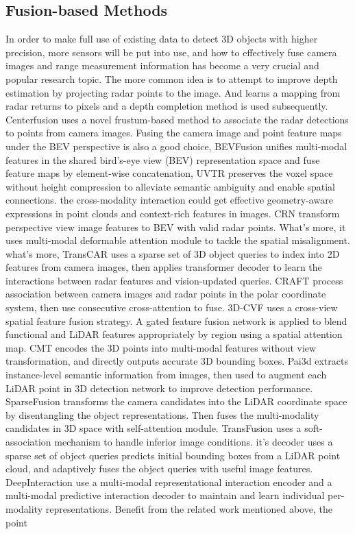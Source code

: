 \documentclass[10pt,twocolumn,letterpaper]{article}
\begin{document}
\subsection{Fusion-based Methods}
In order to make full use of existing data to detect 3D objects with higher precision, more sensors will be put into use, and how to effectively fuse camera images and range measurement information has become a very crucial and popular research topic. The more common idea is to attempt to improve depth estimation by projecting radar points to the image\cite{lin2020depth}. And\cite{long2021radar} learns a mapping from radar returns to pixels and a depth completion method is used subsequently. Centerfusion\cite{nabati2021centerfusion} uses a novel frustum-based method to associate the radar detections to points from camera images. Fusing the camera image and point feature maps under the BEV perspective is also a good choice, BEVFusion\cite{liu2022bevfusion} unifies multi-modal features in the shared bird's-eye view (BEV) representation space and fuse feature maps by element-wise concatenation, UVTR\cite{li2022unifying} preserves the voxel space without height compression to alleviate semantic ambiguity and enable spatial connections. the cross-modality interaction could get effective geometry-aware expressions in point clouds and context-rich features in images. CRN\cite{kim2023crn} transform perspective view image features to BEV with valid radar points. What’s more, it uses multi-modal deformable attention module to tackle the spatial misalignment. what’s more, TransCAR\cite{pang2023transcar} uses a sparse set of 3D object queries to index into 2D features from camera images, then applies transformer decoder to learn the interactions between radar features and vision-updated queries. CRAFT\cite{kim2022craft} process association between camera images and radar points in the polar coordinate system, then use consecutive cross-attention to fuse. 3D-CVF\cite{yoo20203d} uses a cross-view spatial feature fusion strategy. A gated feature fusion network is applied to blend functional and LiDAR features appropriately by region using a spatial attention map. CMT\cite{yan2023cross} encodes the 3D points into multi-modal features without view transformation, and directly outputs accurate 3D bounding boxes. Pai3d\cite{liu2022pai3d} extracts instance-level semantic information from images, then used to augment each LiDAR point in 3D detection network to improve detection performance. SparseFusion\cite{xie2023sparsefusion} transforms the camera candidates into the LiDAR coordinate space by disentangling the object representations. Then fuses the multi-modality candidates in 3D space with self-attention module. TransFusion\cite{bai2022transfusion} uses a soft-association mechanism to handle inferior image conditions. it's decoder uses a sparse set of object queries predicts initial bounding boxes from a LiDAR point cloud, and adaptively fuses the object queries with useful image features. DeepInteraction\cite{yang2022deepinteraction} use a multi-modal representational interaction encoder and a multi-modal predictive interaction decoder to maintain and learn individual per-modality representations. Benefit from the related work mentioned above, the point 
\end{document}
